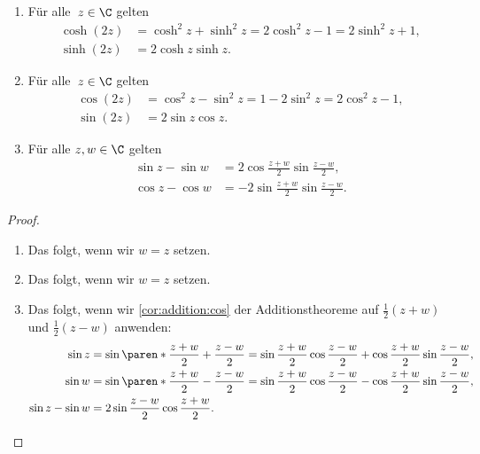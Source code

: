 \documentclass[a4paper]{article}
\begin{document}
\begin{corollary}[Doppelwinkelfunktionen]\leavevmode
    \begin{enumerate}
        \item Für alle~$z \in \C$ gelten
              \begin{align*}
                  \cosh(2z) & = \cosh^2z + \sinh^2z = 2\cosh^2z - 1 = 2\sinh^2z + 1, \\
                  \sinh(2z) & = 2\cosh z\sinh z.
              \end{align*}
        \item Für alle~$z \in \C$ gelten
              \begin{align*}
                  \cos(2z) & = \cos^2z - \sin^2z = 1 - 2\sin^2z = 2\cos^2z - 1, \\
                  \sin(2z) & = 2\sin z\cos z.
              \end{align*}
        \item Für alle $z,w \in \C$ gelten
              \begin{align*}
                  \sin z - \sin w & = 2 \cos\frac{z+w}{2} \sin\frac{z-w}{2},  \\
                  \cos z - \cos w & = -2 \sin\frac{z+w}{2} \sin\frac{z-w}{2}.
              \end{align*}
    \end{enumerate}
\end{corollary}

\begin{proof}\leavevmode
    \begin{enumerate}
        \item Das folgt, wenn wir $w = z$ setzen.
        \item Das folgt, wenn wir $w = z$ setzen.
        \item Das folgt, wenn wir \cref{cor:addition:cos} der Additionstheoreme auf $\frac{1}{2}(z+w)$ und $\frac{1}{2}(z-w)$ anwenden:
              \begin{align*}
                  \sin z          & = \sin\paren*{\frac{z+w}{2}+\frac{z-w}{2}} = \sin\frac{z+w}{2}\cos\frac{z-w}{2} + \cos\frac{z+w}{2}\sin\frac{z-w}{2}, \\
                  \sin w          & = \sin\paren*{\frac{z+w}{2}-\frac{z-w}{2}} = \sin\frac{z+w}{2}\cos\frac{z-w}{2} - \cos\frac{z+w}{2}\sin\frac{z-w}{2}, \\
                  \sin z - \sin w & = 2 \sin\frac{z-w}{2} \cos\frac{z+w}{2}. \qedhere
              \end{align*}
    \end{enumerate}
\end{proof}
\end{document}
